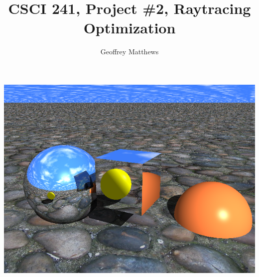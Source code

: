 \documentclass{article}
\title{CSCI 241, Project \#2, Raytracing Optimization}
\author{Geoffrey Matthews}
\begin{document}
\maketitle

\centerline{\includegraphics[scale=0.5]{testmain.png}}
\end{document}
